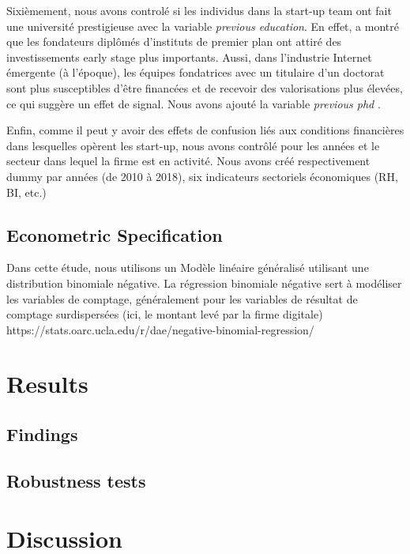\documentclass[12pt]{article}
\begin{document}
Sixièmement, nous avons controlé si les individus dans la start-up team ont fait une université prestigieuse avec la variable \textit{previous education}. En effet, \citet{ratzinger2018impact} a montré que les fondateurs diplômés d'instituts de premier plan ont attiré des investissements early stage plus importants. Aussi, dans l'industrie Internet émergente (à l'époque), les équipes fondatrices avec un titulaire d'un doctorat sont plus susceptibles d'être financées et de recevoir des valorisations plus élevées, ce qui suggère un effet de signal. Nous avons ajouté la variable \textit{previous phd} \citep{hsu2007experienced}.

Enfin, comme il peut y avoir des effets de confusion liés aux conditions financières dans lesquelles opèrent les start-up, nous avons contrôlé pour les années et le secteur dans lequel la firme est en activité. Nous avons créé respectivement dummy par années (de 2010 à 2018), six indicateurs sectoriels économiques (RH, BI, etc.)

\subsection{Econometric Specification}

Dans cette étude, nous utilisons un Modèle linéaire généralisé utilisant une distribution binomiale négative. La régression binomiale négative sert à modéliser les variables de comptage, généralement pour les variables de résultat de comptage surdispersées (ici, le montant levé par la firme digitale) https://stats.oarc.ucla.edu/r/dae/negative-binomial-regression/

\section{Results}

\subsection{Findings}


\subsection{Robustness tests}


\section{Discussion}
\end{document}
